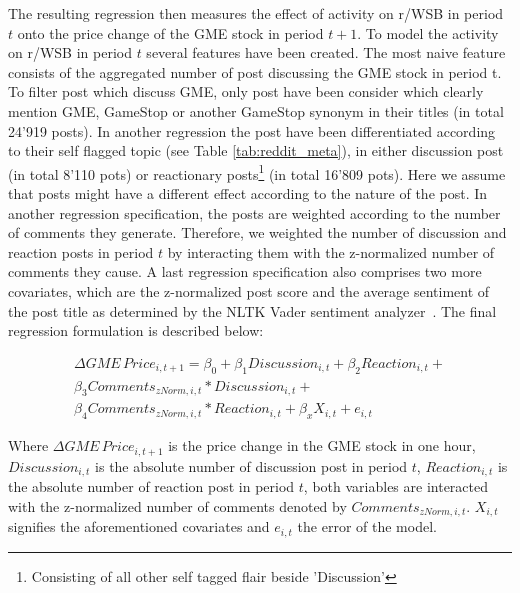 \documentclass[noacm,sigconf,authorversion]{acmart}
\begin{document}
The resulting regression then measures the effect of activity on r/WSB in period $t$ onto the price change of the GME stock in period $t+1$. To model the activity on r/WSB in period $t$ several features have been created. The most naive feature consists of the aggregated number of post discussing the GME stock in period t. To filter post which discuss GME, only post have been consider which clearly mention GME, GameStop or another GameStop synonym in their titles (in total 24'919 posts). In another regression the post have been differentiated according to their self flagged topic (see Table \ref{tab:reddit_meta}), in either discussion post (in total 8'110 pots) or reactionary posts\footnote{Consisting of all other self tagged flair beside 'Discussion'} (in total 16'809 pots). Here we assume that posts might have a different effect according to the nature of the post. In another regression specification, the posts are weighted according to the number of comments they generate. Therefore, we weighted the number of discussion and reaction posts in period $t$ by interacting them with the z-normalized number of comments they cause. A last regression specification also comprises two more covariates, which are the z-normalized post score and the average sentiment of the post title as determined by the NLTK Vader sentiment analyzer~\cite{hutto2014vader}. 
The final regression formulation is described below: 
\begin{small}

\begin{equation*}
\begin{aligned}
\Delta GME \, Price_{i,t+1} = \beta_0 + \beta_{1}Discussion_{i,t} + \beta_{2}Reaction_{i,t} +\\ \beta_{3}Comments_{zNorm, i,t}*Discussion_{i,t} + \\   
\beta_{4}Comments_{zNorm,i,t}*Reaction_{ i,t}  + \beta_{x}X_{i,t} + e_{i,t}
\end{aligned}
\end{equation*}

\end{small}

Where $ \Delta GME \, Price_{i,t+1}$ is the price change in the GME stock in one hour, $Discussion_{i,t}$ is the absolute number of discussion post in period $t$, $Reaction_{i,t}$ is the absolute number of reaction post in period $t$, both variables are interacted with the z-normalized number of comments denoted by $Comments_{zNorm, i,t}$. $X_{i,t}$ signifies the aforementioned covariates and $e_{i,t}$ the error of the model.
\end{document}
